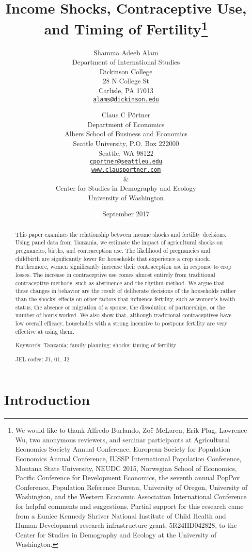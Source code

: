 \documentclass[letterpaper,12pt]{article}
\title{Income Shocks, Contraceptive Use,\\ and Timing of Fertility\thanks{%
We would like to thank 
Alfredo Burlando,
Zo\"e McLaren, 
Erik Plug,
Lawrence Wu, 
two anonymous reviewers, 
and seminar participants at 
Agricultural Economics Society Annual Conference,
European Society for Population Economics Annual Conference,
IUSSP International Population Conference,
Montana State University, 
NEUDC 2015,
Norwegian School of Economics, 
Pacific Conference for Development Economics, 
the seventh annual PopPov Conference, 
Population Reference Bureau,
University of Oregon,
University of Washington,
and the 
Western Economic Association International Conference
for helpful comments and suggestions.
Partial support for this research came from a Eunice Kennedy Shriver National
Institute of Child Health and Human Development research infrastructure grant,
5R24HD042828, to the Center for Studies in Demography and Ecology at the
University of Washington.
}}
\author{Shamma Adeeb Alam\\
	Department of International Studies\\
	Dickinson College\\
	28 N College St\\
	Carlisle, PA 17013\\
	\href{mailto:alams@dickinson.edu}{\texttt{alams@dickinson.edu}}\\
\and
	Claus C P\"ortner\\
    Department of Economics\\
    Albers School of Business and Economics\\
    Seattle University, P.O. Box 222000\\
    Seattle, WA 98122\\
    \href{mailto:cportner@seattleu.edu}{\texttt{cportner@seattleu.edu}}\\
    \href{http://www.clausportner.com}{\texttt{www.clausportner.com}}\\
    \& \\
    Center for Studies in Demography and Ecology \\
    University of Washington\\ 
    }
\date{September 2017}
\begin{document}
\def\sym#1{\ifmmode^{#1}\else\(^{#1}\)\fi}

\setcounter{page}{0}
\maketitle
\thispagestyle{empty}

\newpage
\setcounter{page}{0}
\thispagestyle{empty}

\doublespacing


\begin{abstract} 
\noindent This paper examines the relationship between income 
shocks and fertility decisions. 
Using panel data from Tanzania, we estimate the impact of agricultural shocks 
on 
pregnancies, 
births, 
and 
contraception use.
The likelihood of 
pregnancies and childbirth are significantly lower for households that experience
a crop shock.
Furthermore, women significantly increase their contraception use in response 
to crop losses. 
The increase in contraceptive use comes almost entirely from traditional 
contraceptive methods, such as abstinence and the rhythm method.
We argue that these changes in behavior are the result of deliberate decisions of
the households rather than the shocks' effects on other factors that influence
fertility, such as women's health status, the absence or migration of a spouse, 
the dissolution of partnerships, or the number of hours worked. 
We also show that, although traditional contraceptives have low overall
efficacy, households with a strong incentive to postpone fertility
are very effective at using them.

\noindent Keywords: Tanzania; family planning; shocks; timing of fertility

\noindent JEL codes: J1, 01, J2
\end{abstract}

\newpage


\section{Introduction}
\end{document}
